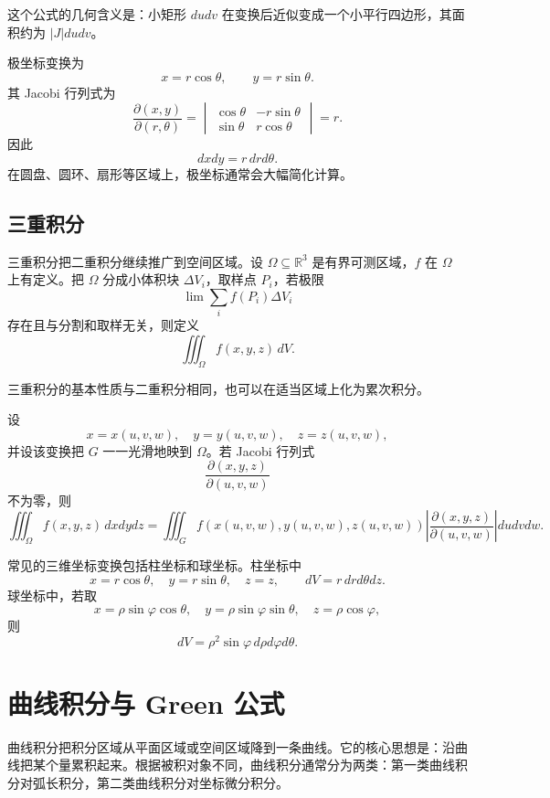 这个公式的几何含义是：小矩形 $dudv$ 在变换后近似变成一个小平行四边形，其面积约为 $|J|dudv$。

\begin{example}[极坐标变换]
极坐标变换为
\[
    x=r\cos\theta,
    \qquad
    y=r\sin\theta.
\]
其 Jacobi 行列式为
\[
    \frac{\partial(x,y)}{\partial(r,\theta)}
    =\begin{vmatrix}
        \cos\theta & -r\sin\theta\\
        \sin\theta & r\cos\theta
    \end{vmatrix}=r.
\]
因此
\[
    dxdy=r\,drd\theta.
\]
在圆盘、圆环、扇形等区域上，极坐标通常会大幅简化计算。
\end{example}

\subsection{三重积分}

三重积分把二重积分继续推广到空间区域。设 $\Omega\subseteq\mathbb{R}^3$ 是有界可测区域，$f$ 在 $\Omega$ 上有定义。把 $\Omega$ 分成小体积块 $\Delta V_i$，取样点 $P_i$，若极限
\[
    \lim\sum_i f(P_i)\Delta V_i
\]
存在且与分割和取样无关，则定义
\[
    \iiint_{\Omega}f(x,y,z)\,dV.
\]

三重积分的基本性质与二重积分相同，也可以在适当区域上化为累次积分。

\begin{theorem}[三重积分变量代换]
设
\[
    x=x(u,v,w),\quad y=y(u,v,w),\quad z=z(u,v,w),
\]
并设该变换把 $G$ 一一光滑地映到 $\Omega$。若 Jacobi 行列式
\[
    \frac{\partial(x,y,z)}{\partial(u,v,w)}
\]
不为零，则
\[
    \iiint_{\Omega}f(x,y,z)\,dxdydz
    =\iiint_G f(x(u,v,w),y(u,v,w),z(u,v,w))
    \left|\frac{\partial(x,y,z)}{\partial(u,v,w)}\right|dudvdw.
\]
\end{theorem}

常见的三维坐标变换包括柱坐标和球坐标。柱坐标中
\[
    x=r\cos\theta,
    \quad y=r\sin\theta,
    \quad z=z,
    \qquad dV=r\,drd\theta dz.
\]
球坐标中，若取
\[
    x=\rho\sin\varphi\cos\theta,
    \quad y=\rho\sin\varphi\sin\theta,
    \quad z=\rho\cos\varphi,
\]
则
\[
    dV=\rho^2\sin\varphi\,d\rho d\varphi d\theta.
\]

\section{曲线积分与 Green 公式}

曲线积分把积分区域从平面区域或空间区域降到一条曲线。它的核心思想是：沿曲线把某个量累积起来。根据被积对象不同，曲线积分通常分为两类：第一类曲线积分对弧长积分，第二类曲线积分对坐标微分积分。

